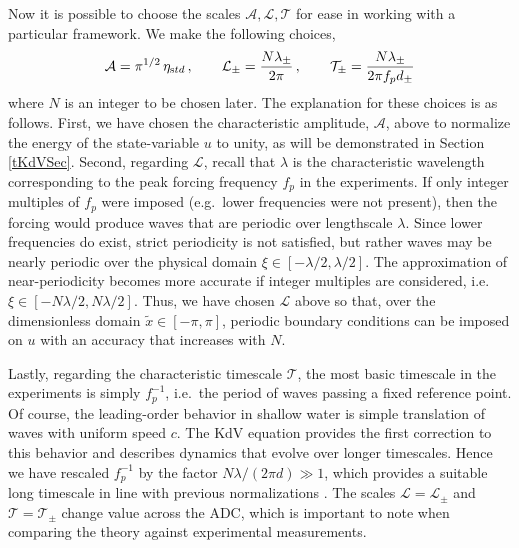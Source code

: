 \documentclass[11pt]{article}
\newcommand{\freqp}{f_p}
\newcommand{\etastd}{\eta_{\text std}}
\newcommand{\depth}{d}
\newcommand{\dupdn}{\depth_{\pm}}
\newcommand{\lam}{\lambda}
\newcommand{\lamupdn}{\lam_{\pm}}
\newcommand{\lamfac}{N}
\newcommand{\ampscale}{\mathcal{A}}
\newcommand{\lengthscale}{\mathcal{L}}
\newcommand{\timescale}{\mathcal{T}}
\begin{document}
Now it is possible to choose the scales $\ampscale, \lengthscale, \timescale$ for ease in working with a particular framework. We make the following choices,
\begin{align}
\label{scales}
\ampscale = \pi^{1/2} \, \etastd \, , \qquad
\lengthscale_{\pm} = \frac{\lamfac \lamupdn}{2 \pi} \, , \qquad
\timescale_{\pm} = \frac{\lamfac \lamupdn}{2 \pi \freqp \dupdn}
\end{align}
where $\lamfac$ is an integer to be chosen later. 
The explanation for these choices is as follows. First, we have chosen the characteristic amplitude, $\ampscale$, above to normalize the energy of the state-variable $u$ to unity, as will be demonstrated in Section \ref{tKdVSec}. Second, regarding $\lengthscale$, recall that $\lam$ is the characteristic wavelength corresponding to the peak forcing frequency $\freqp$ in the experiments. If only integer multiples of $\freqp$ were imposed (e.g.~lower frequencies were not present), then the forcing would produce waves that are periodic over lengthscale $\lam$. Since lower frequencies do exist, strict periodicity is not satisfied, but rather waves may be nearly periodic over the physical domain $\xi \in [-\lam/2, \lam/2]$. The approximation of near-periodicity becomes more accurate if integer multiples are considered, i.e.~$\xi \in [-\lamfac \lam/2, \lamfac \lam/2]$. Thus, we have chosen $\lengthscale$ above so that, over the dimensionless domain $\tilde{x} \in [-\pi, \pi]$, periodic boundary conditions can be  imposed on $u$ with an accuracy that increases with $\lamfac$. 

	Lastly, regarding the characteristic timescale $\timescale$, the most basic timescale in the experiments is simply $\freqp^{-1}$, i.e.~the period of waves passing a fixed reference point. Of course, the leading-order behavior in shallow water is simple translation of waves with uniform speed $c$. The KdV equation provides the first correction to this behavior and describes dynamics that evolve over longer timescales. Hence we have rescaled $\freqp^{-1}$ by the factor $N \lam/(2 \pi \depth) \gg 1$, which provides a suitable long timescale in line with previous normalizations \cite{johnson1997modern}. The scales $\lengthscale = \lengthscale_{\pm}$ and $\timescale = \timescale_{\pm}$ change value across the ADC, which is important to note when comparing the theory against experimental measurements.
\end{document}
